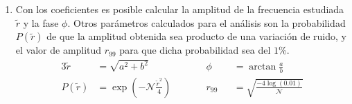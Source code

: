 \begin{enumerate}
        \item Con los coeficientes es posible calcular la amplitud de la frecuencia estudiada $\tilde{r}$ y la fase $\phi$. Otros parámetros calculados para el análisis son la probabilidad $P(\tilde{r})$ de que la amplitud obtenida sea producto de una variación de ruido, y el valor de amplitud $r_{99}$ para que dicha probabilidad sea del $1$\%. 
        \begin{alignat}{3}
            \tilde{r} &= \sqrt{a^2 +b^2}             
            &&\phi&&= \arctan\frac{a}{b}\\
            P(\tilde{r})&= \exp(-\mathcal{N}\frac{\tilde{r}^2}{4}) \qquad
            &&r_{99}&&= \sqrt{\frac{-4\log(0.01)}{\mathcal{N}}}
        \end{alignat}

      \end{enumerate}